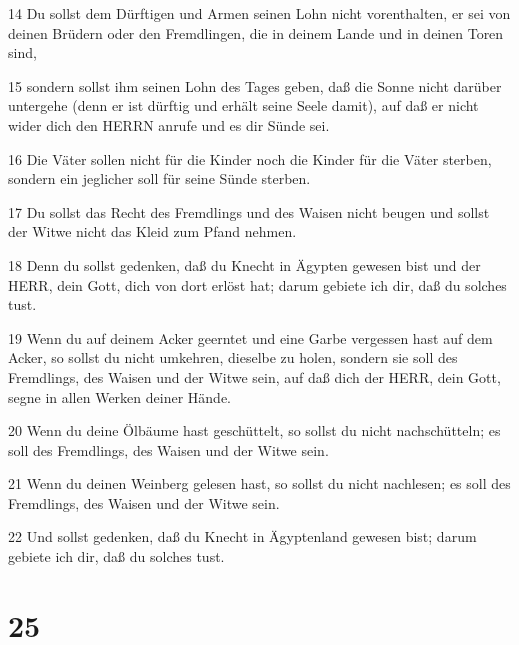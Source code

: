 \par 14 Du sollst dem Dürftigen und Armen seinen Lohn nicht vorenthalten, er sei von deinen Brüdern oder den Fremdlingen, die in deinem Lande und in deinen Toren sind,
\par 15 sondern sollst ihm seinen Lohn des Tages geben, daß die Sonne nicht darüber untergehe (denn er ist dürftig und erhält seine Seele damit), auf daß er nicht wider dich den HERRN anrufe und es dir Sünde sei.
\par 16 Die Väter sollen nicht für die Kinder noch die Kinder für die Väter sterben, sondern ein jeglicher soll für seine Sünde sterben.
\par 17 Du sollst das Recht des Fremdlings und des Waisen nicht beugen und sollst der Witwe nicht das Kleid zum Pfand nehmen.
\par 18 Denn du sollst gedenken, daß du Knecht in Ägypten gewesen bist und der HERR, dein Gott, dich von dort erlöst hat; darum gebiete ich dir, daß du solches tust.
\par 19 Wenn du auf deinem Acker geerntet und eine Garbe vergessen hast auf dem Acker, so sollst du nicht umkehren, dieselbe zu holen, sondern sie soll des Fremdlings, des Waisen und der Witwe sein, auf daß dich der HERR, dein Gott, segne in allen Werken deiner Hände.
\par 20 Wenn du deine Ölbäume hast geschüttelt, so sollst du nicht nachschütteln; es soll des Fremdlings, des Waisen und der Witwe sein.
\par 21 Wenn du deinen Weinberg gelesen hast, so sollst du nicht nachlesen; es soll des Fremdlings, des Waisen und der Witwe sein.
\par 22 Und sollst gedenken, daß du Knecht in Ägyptenland gewesen bist; darum gebiete ich dir, daß du solches tust.

\chapter{25}

